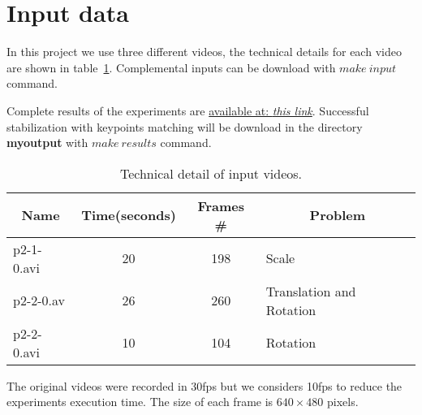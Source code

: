 \section{Input data}

In this project we use three different videos, the technical details for each video are shown in table~\ref{table:input}. Complemental inputs can be download with $make~input$ command.

Complete results of the experiments are \href{https://drive.google.com/open?id=0Bx_3lNzg57uuelRFc2JGWjR5ZkE}{available at: \textit{this link}}. Successful stabilization with keypoints matching will be download in the directory \textbf{myoutput} with $make~results$ command.
\begin{table}[H]
\centering
\begin{tabular}{|l|c|c|l|}
\hline
\multicolumn{1}{|c|}{\textbf{Name}} & \textbf{Time(seconds)} & \textbf{Frames \#} & \multicolumn{1}{c|}{\textbf{Problem}} \\ \hline
p2-1-0.avi & 20 & 198 & Scale \\ \hline
p2-2-0.av & 26 & 260 & Translation and Rotation \\ \hline
p2-2-0.avi & 10 & 104 & Rotation \\ \hline
\end{tabular}
\caption{Technical detail of input videos.}
\label{table:input}
\end{table}

The original videos were recorded in 30fps but we considers 10fps to reduce the experiments execution time. The size of each frame is $640\times 480$ pixels.
